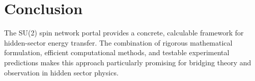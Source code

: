 \documentclass{article}
\begin{document}
\section{Conclusion}

The SU(2) spin network portal provides a concrete, calculable framework for hidden-sector energy transfer. The combination of rigorous mathematical formulation, efficient computational methods, and testable experimental predictions makes this approach particularly promising for bridging theory and observation in hidden sector physics.
\end{document}
